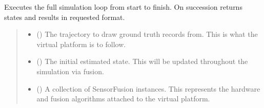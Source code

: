 \documentclass[letterpaper,10pt,english]{sphinxmanual}
\begin{document}
\begin{fulllineitems}
\label{\detokenize{modules/simulation/simulation:qnav.simulation.simulation.run_simulation_loop}}
\pysigstartsignatures
{}
\pysigstopsignatures
\sphinxAtStartPar
Executes the full simulation loop from start to finish.
On succession returns states and results in requested format.
\begin{quote}\begin{description}
\begin{itemize}
\item {} 
\sphinxAtStartPar
{} ({\hyperref[\detokenize{modules/waypoints/trajectory:qnav.waypoints.trajectory.Trajectory}]{}}) \textendash{} The trajectory to draw ground truth records from.
This is what the virtual platform is to follow.

\item {} 
\sphinxAtStartPar
{} ({\hyperref[\detokenize{modules/estimation/state:qnav.estimation.state.EstimatedState}]{}}) \textendash{} The initial estimated state. This will be
updated throughout the simulation via fusion.

\item {} 
\sphinxAtStartPar
{} (\sphinxstyleliteralemphasis{\sphinxupquote{{[}}}{\hyperref[\detokenize{modules/measurement/sensor:qnav.measurement.sensor.SensorFusion}]{\sphinxcrossref{\sphinxstyleliteralemphasis{\sphinxupquote{SensorFusion}}}}}\sphinxstyleliteralemphasis{\sphinxupquote{{]}}}) \textendash{} A collection of SensorFusion instances. This represents
the hardware and fusion algorithms attached to the virtual platform.


\end{itemize}
\end{description}
\end{quote}
\end{fulllineitems}
\end{document}
